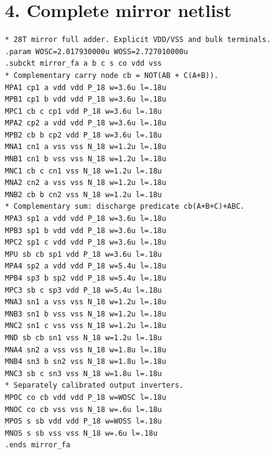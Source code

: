 \documentclass[11pt,a4paper]{article}
\begin{document}
\section*{4. Complete mirror netlist}
\begin{lstlisting}
* 28T mirror full adder. Explicit VDD/VSS and bulk terminals.
.param WOSC=2.017930000u WOSS=2.727010000u
.subckt mirror_fa a b c s co vdd vss
* Complementary carry node cb = NOT(AB + C(A+B)).
MPA1 cp1 a vdd vdd P_18 w=3.6u l=.18u
MPB1 cp1 b vdd vdd P_18 w=3.6u l=.18u
MPC1 cb c cp1 vdd P_18 w=3.6u l=.18u
MPA2 cp2 a vdd vdd P_18 w=3.6u l=.18u
MPB2 cb b cp2 vdd P_18 w=3.6u l=.18u
MNA1 cn1 a vss vss N_18 w=1.2u l=.18u
MNB1 cn1 b vss vss N_18 w=1.2u l=.18u
MNC1 cb c cn1 vss N_18 w=1.2u l=.18u
MNA2 cn2 a vss vss N_18 w=1.2u l=.18u
MNB2 cb b cn2 vss N_18 w=1.2u l=.18u
* Complementary sum: discharge predicate cb(A+B+C)+ABC.
MPA3 sp1 a vdd vdd P_18 w=3.6u l=.18u
MPB3 sp1 b vdd vdd P_18 w=3.6u l=.18u
MPC2 sp1 c vdd vdd P_18 w=3.6u l=.18u
MPU sb cb sp1 vdd P_18 w=3.6u l=.18u
MPA4 sp2 a vdd vdd P_18 w=5.4u l=.18u
MPB4 sp3 b sp2 vdd P_18 w=5.4u l=.18u
MPC3 sb c sp3 vdd P_18 w=5.4u l=.18u
MNA3 sn1 a vss vss N_18 w=1.2u l=.18u
MNB3 sn1 b vss vss N_18 w=1.2u l=.18u
MNC2 sn1 c vss vss N_18 w=1.2u l=.18u
MND sb cb sn1 vss N_18 w=1.2u l=.18u
MNA4 sn2 a vss vss N_18 w=1.8u l=.18u
MNB4 sn3 b sn2 vss N_18 w=1.8u l=.18u
MNC3 sb c sn3 vss N_18 w=1.8u l=.18u
* Separately calibrated output inverters.
MPOC co cb vdd vdd P_18 w=WOSC l=.18u
MNOC co cb vss vss N_18 w=.6u l=.18u
MPOS s sb vdd vdd P_18 w=WOSS l=.18u
MNOS s sb vss vss N_18 w=.6u l=.18u
.ends mirror_fa
\end{lstlisting}
\newpage
\end{document}
